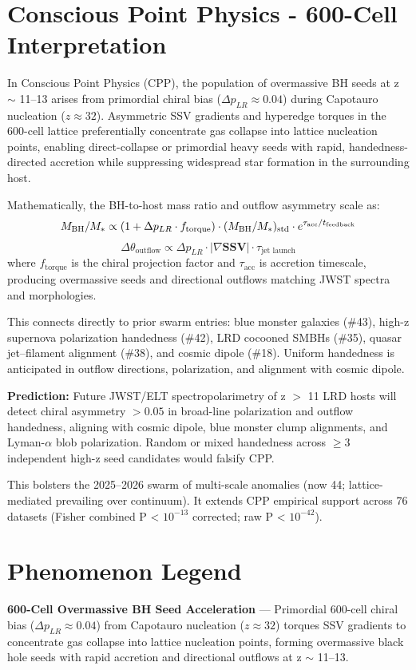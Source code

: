 \documentclass[11pt]{article}
\begin{document}
\section{Conscious Point Physics - 600-Cell Interpretation}
In Conscious Point Physics (CPP), the population of overmassive BH seeds at z $\sim$ 11--13 arises from primordial chiral bias ($\Delta p_{LR} \approx 0.04$) during Capotauro nucleation ($z \approx 32$). Asymmetric SSV gradients and hyperedge torques in the 600-cell lattice preferentially concentrate gas collapse into lattice nucleation points, enabling direct-collapse or primordial heavy seeds with rapid, handedness-directed accretion while suppressing widespread star formation in the surrounding host.  

Mathematically, the BH-to-host mass ratio and outflow asymmetry scale as:  
\[
M_{\rm BH}/M_* \propto (1 + \Delta p_{LR} \cdot f_{\text{torque}}) \cdot (M_{\rm BH}/M_*)_{\rm std} \cdot e^{\tau_{\text{acc}}/t_{\text{feedback}}}
\]  
\[
\Delta \theta_{\text{outflow}} \propto \Delta p_{LR} \cdot |\nabla \mathbf{SSV}| \cdot \tau_{\text{jet launch}}
\]  
where $f_{\text{torque}}$ is the chiral projection factor and $\tau_{\text{acc}}$ is accretion timescale, producing overmassive seeds and directional outflows matching JWST spectra and morphologies.  

This connects directly to prior swarm entries: blue monster galaxies (\#43), high-z supernova polarization handedness (\#42), LRD cocooned SMBHs (\#35), quasar jet–filament alignment (\#38), and cosmic dipole (\#18). Uniform handedness is anticipated in outflow directions, polarization, and alignment with cosmic dipole.  

\textbf{Prediction:} Future JWST/ELT spectropolarimetry of z $>$ 11 LRD hosts will detect chiral asymmetry $>0.05$ in broad-line polarization and outflow handedness, aligning with cosmic dipole, blue monster clump alignments, and Lyman-$\alpha$ blob polarization. Random or mixed handedness across $\geq 3$ independent high-z seed candidates would falsify CPP.  

This bolsters the 2025--2026 swarm of multi-scale anomalies (now 44; lattice-mediated prevailing over continuum). It extends CPP empirical support across 76 datasets (Fisher combined P < $10^{-13}$ corrected; raw P < $10^{-42}$).

\section{Phenomenon Legend}
\textbf{600-Cell Overmassive BH Seed Acceleration} — Primordial 600-cell chiral bias ($\Delta p_{LR} \approx 0.04$) from Capotauro nucleation ($z \approx 32$) torques SSV gradients to concentrate gas collapse into lattice nucleation points, forming overmassive black hole seeds with rapid accretion and directional outflows at z $\sim$ 11--13.
\end{document}

